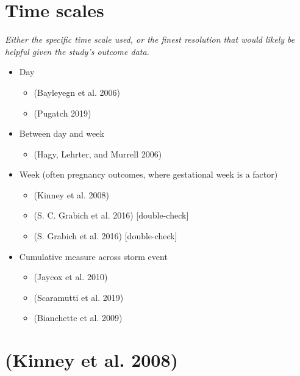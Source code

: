 \documentclass[
]{article}
\providecommand{\tightlist}{%
  \setlength{\itemsep}{0pt}\setlength{\parskip}{0pt}}
\begin{document}
\hypertarget{time-scales}{%
\section{Time scales}\label{time-scales}}

\emph{Either the specific time scale used, or the finest resolution that
would likely be helpful given the study's outcome data.}

\begin{itemize}
\tightlist
\item
  Day

  \begin{itemize}
  \tightlist
  \item
    (Bayleyegn et al. 2006)
  \item
    (Pugatch 2019)
  \end{itemize}
\item
  Between day and week

  \begin{itemize}
  \tightlist
  \item
    (Hagy, Lehrter, and Murrell 2006)
  \end{itemize}
\item
  Week (often pregnancy outcomes, where gestational week is a factor)

  \begin{itemize}
  \tightlist
  \item
    (Kinney et al. 2008)
  \item
    (S. C. Grabich et al. 2016) {[}double-check{]}
  \item
    (S. Grabich et al. 2016) {[}double-check{]}
  \end{itemize}
\item
  Cumulative measure across storm event

  \begin{itemize}
  \tightlist
  \item
    (Jaycox et al. 2010)
  \item
    (Scaramutti et al. 2019)
  \item
    (Bianchette et al. 2009)
  \end{itemize}
\end{itemize}

\hypertarget{kinney2008autism}{%
\section{(Kinney et al. 2008)}\label{kinney2008autism}}
\end{document}
